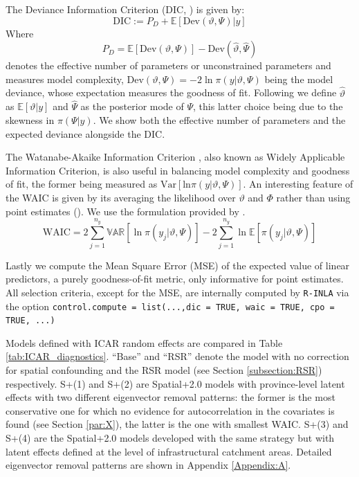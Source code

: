 \documentclass[openany, 11pt, oneside]{book}
\begin{document}
The Deviance Information Criterion (DIC, \cite{DIC}) is given by:
$$
\mathrm{DIC} := P_D + \mathbb{E}[\mathrm{Dev}(\vartheta, \Psi) \vert y]
$$
Where $$P_D = \mathbb{E}[\mathrm{Dev}(\vartheta, \Psi)] - \mathrm{Dev}(\hat{\vartheta}, \hat{\Psi})$$ denotes the effective number of parameters or unconstrained parameters and measures model complexity, $\mathrm{Dev}(\vartheta, \Psi) = -2 \ln \pi(y \vert \vartheta, \Psi)$ being the model deviance, whose expectation measures the goodness of fit. Following \cite{INLA} we define $\hat{\vartheta}$ as $\mathbb{E}[\vartheta \vert y]$ and $\hat{\Psi}$  as the posterior mode of $\Psi$, this latter choice being due to the skewness in $\pi(\Psi \vert y)$. We show both the effective number of parameters and the expected deviance alongside the DIC.
 
The Watanabe-Akaike Information Criterion \cite{WAIC}, also known as Widely Applicable Information Criterion, is also useful in balancing model complexity and goodness of fit, the former being measured as $\mathrm{Var}[\mathrm{ln} \pi(y \vert\vartheta, \Psi)]$. An interesting feature of the WAIC is given by its averaging the likelihood over $\vartheta$ and $\Phi$ rather than using point estimates (\cite{GelmanWAIC}). We use the formulation provided by \cite{GelmanWAIC}. \\
 

$$
\mathrm{WAIC} = 2 \sum_{j=1}^{n_y} \mathbb{VAR}[\ln \pi(y_j \vert\vartheta, \Psi)]
- 2 \sum_{j=1}^{n_y}  \ln \mathbb{E}[\pi(y_j \vert \vartheta, \Psi)]
$$

Lastly we compute the Mean Square Error (MSE) of the expected value of linear predictors, a purely goodness-of-fit metric, only informative for point estimates. All selection criteria, except for the MSE, are internally computed by \texttt{R-INLA} via the option \texttt{control.compute = list(...,dic = TRUE, waic = TRUE, cpo = TRUE, ...)}

Models defined with ICAR random effects are compared in Table \ref{tab:ICAR_diagnostics}. ``Base'' and ``RSR'' denote the model with no correction for spatial confounding and the RSR model (see Section \ref{subsection:RSR}) respectively.
S+(1) and S+(2) are Spatial+2.0 models with province-level latent effects with two different eigenvector removal patterns: the former is the most conservative one for which no evidence for autocorrelation in the covariates is found (see Section \ref{par:X}), the latter is the one with smallest WAIC.
S+(3) and S+(4) are the Spatial+2.0 models developed with the same strategy but with latent effects defined at the level of infrastructural catchment areas. Detailed eigenvector removal patterns are shown in Appendix \ref{Appendix:A}.
\end{document}

